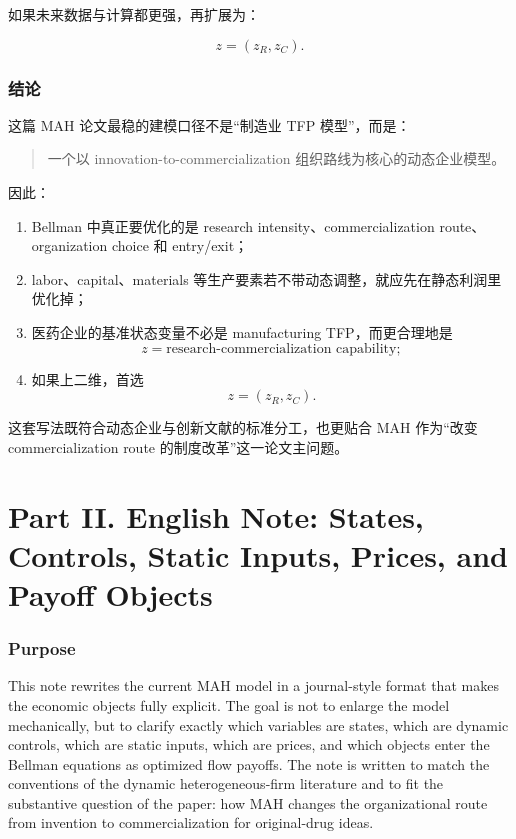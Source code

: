 \documentclass[12pt]{ctexart}
\begin{document}
如果未来数据与计算都更强，再扩展为：

\[
z=(z_R,z_C).
\]

\section{结论}

这篇 MAH 论文最稳的建模口径不是“制造业 TFP 模型”，而是：

\begin{quote}
一个以 innovation-to-commercialization 组织路线为核心的动态企业模型。
\end{quote}

因此：

\begin{enumerate}[leftmargin=2em]
    \item Bellman 中真正要优化的是 research intensity、commercialization route、organization choice 和 entry/exit；
    \item labor、capital、materials 等生产要素若不带动态调整，就应先在静态利润里优化掉；
    \item 医药企业的基准状态变量不必是 manufacturing TFP，而更合理地是
    \[
    z=\text{research-commercialization capability};
    \]
    \item 如果上二维，首选
    \[
    z=(z_R,z_C).
    \]
\end{enumerate}

这套写法既符合动态企业与创新文献的标准分工，也更贴合 MAH 作为“改变 commercialization route 的制度改革”这一论文主问题。


\newpage
\part*{Part II. English Note: States, Controls, Static Inputs, Prices, and Payoff Objects}


\section{Purpose}

This note rewrites the current MAH model in a journal-style format that makes the
economic objects fully explicit. The goal is not to enlarge the model mechanically,
but to clarify exactly which variables are states, which are dynamic controls, which
are static inputs, which are prices, and which objects enter the Bellman equations
as optimized flow payoffs. The note is written to match the conventions of the
dynamic heterogeneous-firm literature and to fit the substantive question of the
paper: how MAH changes the organizational route from invention to commercialization
for original-drug ideas.
\end{document}
